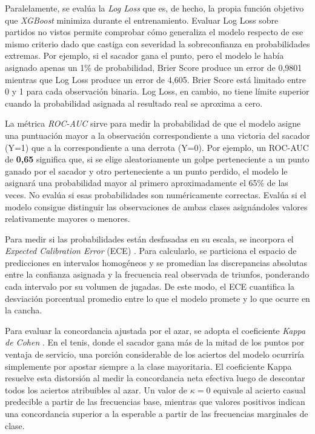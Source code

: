 \documentclass[journal]{IEEEtran}
\begin{document}
Paralelamente, se evalúa la \textit{Log Loss} \cite{good1952rational, bishop2006pattern} que es, de hecho, la propia función objetivo que \textit{XGBoost} minimiza durante el entrenamiento. Evaluar Log Loss sobre partidos no vistos permite comprobar cómo generaliza el modelo respecto de ese mismo criterio dado que castiga con severidad la sobreconfianza en probabilidades extremas. Por ejemplo, si el sacador gana el punto, pero el modelo le había asignado apenas un 1\% de probabilidad, Brier Score produce un error de 0,9801 mientras que Log Loss produce un error de 4,605. Brier Score está limitado entre 0 y 1 para cada observación binaria. Log Loss, en cambio, no tiene límite superior cuando la probabilidad asignada al resultado real se aproxima a cero.

La métrica \textit{ROC-AUC} \cite{fawcett2006introduction, hanley1982meaning} sirve para medir la probabilidad de que el modelo asigne una puntuación mayor a la observación correspondiente a una victoria del sacador (Y=1) que a la correspondiente a una derrota (Y=0). Por ejemplo, un ROC-AUC de \textbf{0,65} significa que, si se elige aleatoriamente un golpe perteneciente a un punto ganado por el sacador y otro perteneciente a un punto perdido, el modelo le asignará una probabilidad mayor al primero aproximadamente el 65\% de las veces. No evalúa si esas probabilidades son numéricamente correctas. Evalúa si el modelo consigue distinguir las observaciones de ambas clases asignándoles valores relativamente mayores o menores.

Para medir si las probabilidades están desfasadas en su escala, se incorpora el \textit{Expected Calibration Error} (ECE) \cite{guo2017calibration}. Para calcularlo, se particiona el espacio de predicciones en intervalos homogéneos y se promedian las discrepancias absolutas entre la confianza asignada y la frecuencia real observada de triunfos, ponderando cada intervalo por su volumen de jugadas. De este modo, el ECE cuantifica la desviación porcentual promedio entre lo que el modelo promete y lo que ocurre en la cancha.

Para evaluar la concordancia ajustada por el azar, se adopta el coeficiente \textit{Kappa de Cohen} \cite{cohen1960coefficient}. En el tenis, donde el sacador gana más de la mitad de los puntos por ventaja de servicio, una porción considerable de los aciertos del modelo ocurriría simplemente por apostar siempre a la clase mayoritaria. El coeficiente Kappa resuelve esta distorsión al medir la concordancia neta efectiva luego de descontar todos los aciertos atribuibles al azar. Un valor de $\kappa = 0$ equivale al acierto casual predecible a partir de las frecuencias base, mientras que valores positivos indican una concordancia superior a la esperable a partir de las frecuencias marginales de clase.
\end{document}
